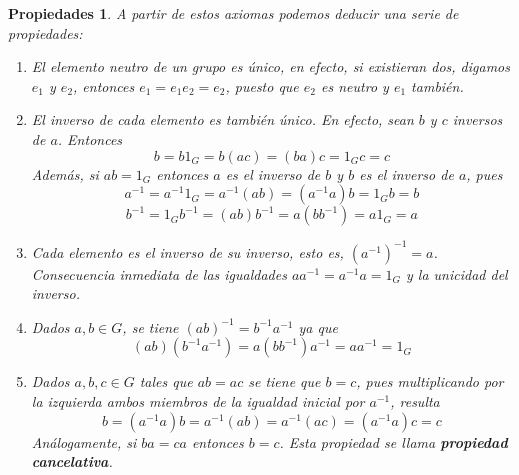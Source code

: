 \documentclass[12pt]{article}
\newtheorem{properties}{Propiedades}[theorem]
\begin{document}
\begin{properties}A partir de estos axiomas podemos deducir una serie de propiedades: 
\renewcommand{\labelenumi}{\arabic{enumi}.}
\begin{enumerate}
\item El \textit{elemento neutro} de un grupo es único, en efecto, si existieran dos, digamos $e_{1}$ y $e_{2}$, entonces $e_{1} = e_{1}  e_{2} = e_{2}$, puesto que $e_{2}$ es neutro y $e_{1}$ también.
\item El \textit{inverso} de cada elemento es también único. En efecto, sean $b$ y $c$ inversos de $a$. Entonces $$b = b  1_{G} = b  (a  c) = (b  a)  c = 1_{G}  c = c $$ Además, si $a  b = 1_{G}$ entonces $a$ es el inverso de $b$ y $b$ es el inverso de $a$, pues $$a^{-1} = a^{-1}  1_{G} = a^{-1} (a  b) = (a^{-1}  a)  b = 1_{G}  b= b $$ $$b^{-1} = 1_{G}  b^{-1} = (a  b)  b^{-1} = a  (b  b^{-1}) = a 1_{G} = a $$
\item Cada elemento es el inverso de su inverso, esto es, $(a^{-1})^{-1} = a$. Consecuencia inmediata de las igualdades $a  a^{-1} = a^{-1}  a = 1_{G}$ y la unicidad del inverso.
\item Dados $a, b \in G$, se tiene $(a  b)^{-1} = b^{-1}  a^{-1}$ ya que $$(a  b)  (b^{-1}  a^{-1}) = a  (b  b^{-1})  a^{-1} = a  a^{-1} = 1_{G} $$
\item Dados $a,b,c \in G$ tales que $a  b = a  c$ se tiene que $b = c$, pues multiplicando por la izquierda ambos miembros de la igualdad inicial por 
$a^{-1}$, resulta $$b = (a^{-1}  a)  b = a^{-1}  (a  b) = a^{-1}  (a  c) = (a^{-1}  a)  c = c $$
Análogamente, si $b  a = c  a$ entonces $b = c$. Esta propiedad se llama \textbf{propiedad cancelativa}.
\end{enumerate}
\end{properties}
\end{document}
